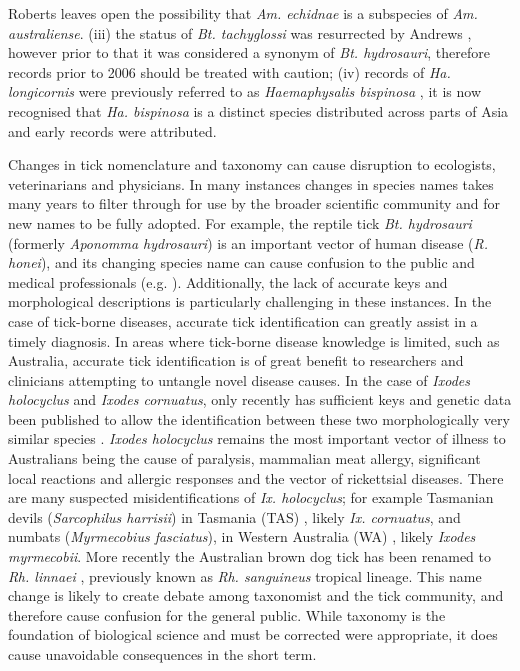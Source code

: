 \documentclass[a4paper, nobind]{templates/ociamthesis}
\begin{document}
Roberts \autocite*{robertsAustralianTicks1970} leaves open the possibility that \emph{Am. echidnae} is a subspecies of \emph{Am. australiense}.
(iii) the status of \emph{Bt. tachyglossi} was resurrected by Andrews \autocite*{andrewsSystematicStatusAponomma2006}, however prior to that it was considered a synonym of \emph{Bt. hydrosauri}, therefore records prior to 2006 should be treated with caution;
(iv) records of \emph{Ha. longicornis} were previously referred to as \emph{Haemaphysalis bispinosa} \autocite{robertsSystematicStudyAustralian1963}, it is now recognised that \emph{Ha. bispinosa} is a distinct species distributed across parts of Asia and early records were attributed.

Changes in tick nomenclature and taxonomy can cause disruption to ecologists, veterinarians and physicians.
In many instances changes in species names takes many years to filter through for use by the broader scientific community and for new names to be fully adopted.
For example, the reptile tick \emph{Bt. hydrosauri} (formerly \emph{Aponomma hydrosauri}) is an important vector of human disease (\emph{R. honei}), and its changing species name can cause confusion to the public and medical professionals (e.g. \textcite{stenosAponommaHydrosauriReptileassociated2003}).
Additionally, the lack of accurate keys and morphological descriptions is particularly challenging in these instances.
In the case of tick-borne diseases, accurate tick identification can greatly assist in a timely diagnosis. In areas where tick-borne disease knowledge is limited, such as Australia, accurate tick identification is of great benefit to researchers and clinicians attempting to untangle novel disease causes.
In the case of \emph{Ixodes holocyclus} and \emph{Ixodes cornuatus}, only recently has sufficient keys and genetic data been published to allow the identification between these two morphologically very similar species \autocite{songPhylogeneticPhylogeographicRelationships2011,barkerTicksAustraliaSpecies2014,kwakKeysMorphologicalIdentification2017}.
\emph{Ixodes holocyclus} remains the most important vector of illness to Australians being the cause of paralysis, mammalian meat allergy, significant local reactions and allergic responses and the vector of rickettsial diseases.
There are many suspected misidentifications of \emph{Ix. holocyclus}; for example Tasmanian devils (\emph{Sarcophilus harrisii}) in Tasmania (TAS) \autocite{vilcinsDetectionHepatozoonSpotted2009}, likely \emph{Ix. cornuatus}, and numbats (\emph{Myrmecobius fasciatus}), in Western Australia (WA) \autocite{calabyObservationsBandedAnteater1960}, likely \emph{Ixodes myrmecobii}.
More recently the Australian brown dog tick has been renamed to \emph{Rh. linnaei} \autocite{slapetaTropicalLineageBrown2021}, previously known as \emph{Rh. sanguineus} tropical lineage.
This name change is likely to create debate among taxonomist and the tick community, and therefore cause confusion for the general public.
While taxonomy is the foundation of biological science and must be corrected were appropriate, it does cause unavoidable consequences in the short term.
\end{document}
